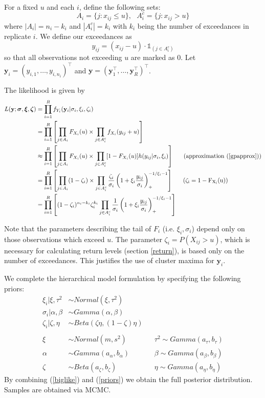 \documentclass[12pt]{article}
\newcommand{\m}[1]{\mathbf{\bm{#1}}}
\newcommand{\ind}{\mathds{1}}
\begin{document}
For a fixed $u$ and each $i$, define the following sets:
\[ A_i = \{j:x_{ij}\leq u\},~~~ A_i^c = \{j: x_{ij}>u\} \]
where $|A_i|=n_i-k_i$ and $|A_i^c|=k_i$ with $k_i$ being the number of exceedances in replicate $i$. We define our exceedances as
\[ y_{ij} = (x_{ij}-u)\cdot \ind_{(j \in A_i^c)} \]
so that all observations not exceeding $u$ are marked as $0$. Let $\m{y}_i=(y_{i,1},\ldots,y_{i,n_i})^\top$ and $\m{y}=(\m{y}_1^\top,\ldots,\m{y}_R^\top)^\top$.

The likelihood is given by
\begin{align}
L(\m{y}; \m{\sigma}, \m{\xi}, \m{\zeta}) &= \prod_{i=1}^R f_{Y_i}(\m{y}_i|\sigma_i,\xi_i,\zeta_i) \nonumber \\
&= \prod_{i=1}^R\left[\prod_{j\in A_i} F_{X_i}(u) \times \prod_{j\in A_i^c} f_{X_i}(y_{ij}+u)\right] \nonumber \\
&\approx \prod_{i=1}^R\left[\prod_{j\in A_i} F_{X_i}(u) \times \prod_{j\in A_i^c} [1-F_{X_i}(u)]h(y_{ij}|\sigma_i,\xi_i)\right]~~~~~\mathrm{(approximation~(\ref{gpapprox}))} \nonumber \\
&= \prod_{i=1}^R\left[\prod_{j\in A_i} (1-\zeta_i)\times \prod_{j\in A_i^c} \frac{\zeta_i}{\sigma_i}\left(1+\xi_i\frac{y_{ij}}{\sigma_i}\right)_+^{-1/\xi_i-1}\right]~~~~~\mathrm{(\zeta_i=1-F_{X_i}(u))} \nonumber \\
&= \prod_{i=1}^R\left[(1-\zeta_i)^{n_i-k_i}\zeta_i^{k_i}\prod_{j\in A_i^c}\frac{1}{\sigma_i}\left(1+\xi_i\frac{y_{ij}}{\sigma_i}\right)_+^{-1/\xi_i-1}\right] \label{biglike}
\end{align}

Note that the parameters describing the tail of $F_i$ (i.e. $\xi_i,\sigma_i$) depend only on those observations which exceed $u$. The parameter $\zeta_i=P(X_{ij}>u)$, which is necessary for calculating return levels (section \ref{return}), is based only on the number of exceedances. This justifies the use of cluster maxima for $\m{y}_i$.

We complete the hierarchical model formulation by specifying the following priors:
\begin{align}
\xi_i|\xi, \tau^2  &\sim Normal(\xi, \tau^2) \nonumber \\
\sigma_i|\alpha, \beta &\sim Gamma(\alpha, \beta) \nonumber \\
\zeta_i|\zeta, \eta &\sim Beta(\zeta\eta, (1-\zeta)\eta) \nonumber \\
 \label{priors} \\
\xi &\sim Normal(m, s^2)&  &\tau^2 \sim Gamma(a_\tau, b_\tau) \nonumber \\
\alpha &\sim Gamma(a_\alpha, b_\alpha)&  &\beta \sim Gamma(a_\beta, b_\beta) \nonumber \\
\zeta &\sim Beta(a_\zeta, b_\zeta)&  &\eta \sim Gamma(a_\eta, b_\eta) \nonumber
\end{align}
By combining (\ref{biglike}) and (\ref{priors}) we obtain the full posterior distribution. Samples are obtained via MCMC.
\end{document}
